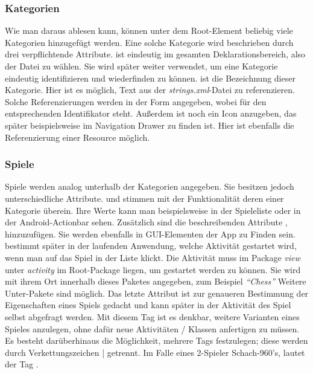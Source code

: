\subsubsection{Kategorien}

Wie man daraus ablesen kann, können unter dem Root-Element  beliebig
viele Kategorien hinzugefügt werden. Eine solche Kategorie wird beschrieben
durch drei verpflichtende Attribute.  ist eindeutig im gesamten
Deklarationsbereich, also der Datei zu wählen. Sie wird später weiter verwendet,
um eine Kategorie eindeutig identifizieren und wiederfinden zu können.
 ist die Bezeichnung dieser Kategorie. Hier ist es möglich, Text aus
der \emph{strings.xml}-Datei zu referenzieren. Solche Referenzierungen werden in
der Form  angegeben, wobei  für den
entsprechenden Identifikator steht. Außerdem ist noch ein Icon anzugeben, das
später beispielsweise im Navigation Drawer zu finden ist. Hier ist ebenfalls die
Referenzierung einer Resource möglich.

\subsubsection{Spiele}
\label{sssec:games}

Spiele werden analog unterhalb der Kategorien angegeben. Sie besitzen jedoch
unterschiedliche Attribute.  und  stimmen mit der
Funktionalität deren einer Kategorie überein. Ihre Werte kann man
beispielsweise in der Spieleliste  oder in
der Android-Actionbar sehen. Zusätzlich sind die beschreibenden Attribute
,  hinzuzufügen. Sie werden ebenfalls in
GUI-Elementen der App zu Finden sein.  bestimmt später in der
laufenden Anwendung, welche Aktivität gestartet wird, wenn man auf das Spiel in
der Liste klickt. Die Aktivität muss im Package \emph{view} unter
\emph{activity} im Root-Package liegen, um gestartet werden zu können. Sie wird
mit ihrem Ort innerhalb dieses Paketes angegeben, zum Beispiel \emph{``Chess''}
Weitere Unter-Pakete sind möglich. Das letzte Attribut  ist zur
genaueren Bestimmung der Eigenschaften eines Spiels gedacht und kann später in
der Aktivität des Spiel selbst abgefragt werden. Mit diesem Tag ist es denkbar,
weitere Varianten eines Spieles anzulegen, ohne dafür neue Aktivitäten
/ Klassen anfertigen zu müssen. Es besteht darüberhinaus die Möglichkeit,
mehrere Tags festzulegen; diese werden durch Verkettungszeichen | getrennt. Im
Falle eines 2-Spieler Schach-960's, lautet der Tag .

